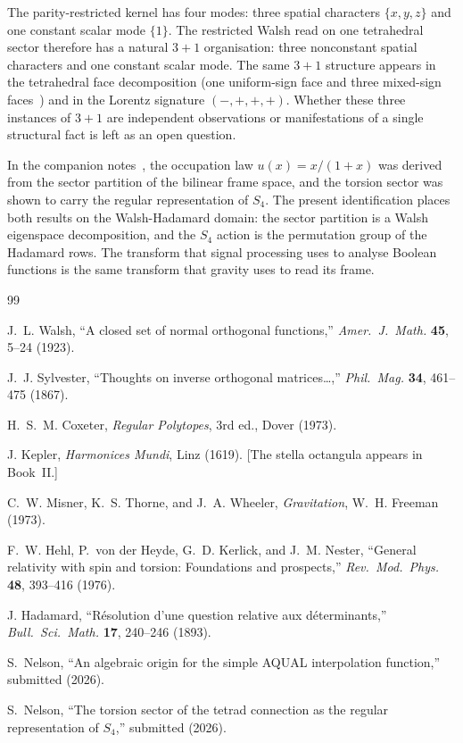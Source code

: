 \documentclass[11pt]{article}
\begin{document}
The parity-restricted kernel has four modes: three spatial
characters $\{x,y,z\}$ and one constant scalar mode $\{1\}$.
The restricted Walsh read on one tetrahedral sector therefore has
a natural $3+1$ organisation: three nonconstant spatial characters
and one constant scalar mode.  The same $3+1$ structure appears in
the tetrahedral face decomposition (one uniform-sign face and
three mixed-sign faces~\cite{NelsonA}) and in the Lorentz
signature $(-,+,+,+)$.  Whether these three instances of $3+1$
are independent observations or manifestations of a single
structural fact is left as an open question.

In the companion notes~\cite{NelsonA,NelsonB}, the occupation law
$u(x)=x/(1+x)$ was derived from the sector partition of the
bilinear frame space, and the torsion sector was shown to carry the
regular representation of $S_4$.  The present identification places
both results on the Walsh-Hadamard domain: the sector partition is
a Walsh eigenspace decomposition, and the $S_4$ action is the
permutation group of the Hadamard rows.  The transform that signal
processing uses to analyse Boolean functions is the same transform
that gravity uses to read its frame.


\begin{thebibliography}{99}

J.~L. Walsh,
``A closed set of normal orthogonal functions,''
\emph{Amer.\ J.\ Math.} \textbf{45}, 5--24 (1923).

J.~J. Sylvester,
``Thoughts on inverse orthogonal matrices\ldots,''
\emph{Phil.\ Mag.} \textbf{34}, 461--475 (1867).

H.~S.~M. Coxeter,
\emph{Regular Polytopes},
3rd ed., Dover (1973).

J. Kepler,
\emph{Harmonices Mundi}, Linz (1619).
[The stella octangula appears in Book~II.]

C.~W. Misner, K.~S. Thorne, and J.~A. Wheeler,
\emph{Gravitation},
W.~H. Freeman (1973).

F.~W. Hehl, P.~von der Heyde, G.~D. Kerlick, and J.~M. Nester,
``General relativity with spin and torsion: Foundations and
prospects,''
\emph{Rev.\ Mod.\ Phys.} \textbf{48}, 393--416 (1976).

J. Hadamard,
``R\'esolution d'une question relative aux d\'eterminants,''
\emph{Bull.\ Sci.\ Math.} \textbf{17}, 240--246 (1893).

S.~Nelson,
``An algebraic origin for the simple AQUAL interpolation
function,''
submitted (2026).

S.~Nelson,
``The torsion sector of the tetrad connection as the regular
representation of $S_4$,''
submitted (2026).

\end{thebibliography}
\end{document}
